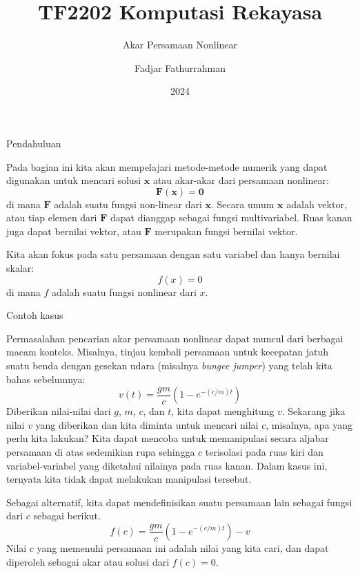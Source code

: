 

\title{TF2202 Komputasi Rekayasa}
\subtitle{Akar Persamaan Nonlinear}
\author{Fadjar Fathurrahman}
\date{2024}



\frame{\titlepage}

\begin{frame}{Pendahuluan}

Pada bagian ini kita akan mempelajari metode-metode numerik yang
dapat digunakan untuk mencari solusi $\mathbf{x}$ atau akar-akar
dari persamaan nonlinear:
\begin{equation}
\mathbf{F}(\mathbf{x}) = \mathbf{0}
\label{eq:FX0_nonlinear}
\end{equation}
di mana $\mathbf{F}$ adalah suatu fungsi non-linear dari $\mathbf{x}$.
Secara umum $\mathbf{x}$ adalah vektor, atau tiap elemen dari
$\mathbf{F}$ dapat dianggap sebagai
fungsi multivariabel. Ruas kanan juga dapat bernilai vektor, atau
$\mathbf{F}$ merupakan fungsi bernilai vektor.

Kita akan fokus pada satu persamaan dengan satu variabel dan hanya
bernilai skalar:
\begin{equation}
f(x) = 0
\label{eq:fx0}
\end{equation}
di mana $f$ adalah suatu fungsi nonlinear dari $x$.
\end{frame}


\begin{frame}{Contoh kasus}
\fontsize{9}{10}\selectfont

Permasalahan pencarian akar persamaan nonlinear dapat muncul dari berbagai
macam konteks. Misalnya, tinjau kembali persamaan untuk kecepatan
jatuh suatu benda dengan gesekan udara (misalnya \textit{bungee jumper})
yang telah kita bahas sebelumnya:
\begin{equation*}
v(t) = \frac{gm}{c}\left( 1 - e^{-(c/m)t} \right)
\end{equation*}
Diberikan nilai-nilai dari $g$, $m$, $c$, dan $t$, kita dapat menghitung
$v$. Sekarang jika nilai $v$ yang diberikan dan kita diminta untuk mencari
nilai $c$, misalnya, apa yang perlu kita lakukan? Kita dapat
mencoba untuk memanipulasi secara aljabar persamaan di atas sedemikian rupa sehingga
$c$ terisolasi pada ruas kiri dan variabel-variabel yang diketahui nilainya
pada ruas kanan. Dalam kasus ini, ternyata kita tidak dapat melakukan
manipulasi tersebut.

Sebagai alternatif, kita dapat mendefinisikan suatu persamaan lain sebagai fungsi
dari $c$ sebagai berikut.
$$
f(c) = \frac{gm}{c}\left( 1 - e^{-(c/m)t} \right) - v
$$
Nilai $c$ yang memenuhi persamaan ini adalah nilai yang kita cari, dan dapat
diperoleh sebagai akar atau solusi dari $f(c) = 0$.

\end{frame}

